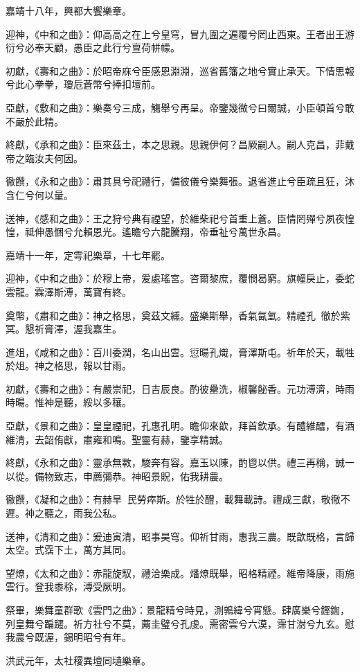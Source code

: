 嘉靖十八年，興都大饗樂章。

迎神，《中和之曲》：仰高高之在上兮皇穹，冒九圍之遍覆兮罔止西東。王者出王游衍兮必奉天顧，愚臣之此行兮亶荷帡幪。

初獻，《壽和之曲》：於昭帝庥兮臣感恩淵淵，巡省舊籓之地兮實止承天。下情思報兮此心拳拳，瓊卮蒼幣兮捧扣壇前。

亞獻，《敷和之曲》：樂奏兮三成，觴舉兮再呈。帝鑒幾微兮曰爾誠，小臣頓首兮敢不嚴於此精。

終獻，《承和之曲》：臣來茲土，本之思親。思親伊何？昌厥嗣人。嗣人克昌，菲戴帝之臨汝夫何因。

徹饌，《永和之曲》：肅其具兮祀禮行，備彼儀兮樂舞張。退省進止兮臣疏且狂，沐含仁兮何以量。

送神，《感和之曲》：王之狩兮典有禋望，於維柴祀兮首重上蒼。臣情罔殫兮夙夜惶惶，祗伸愚悃兮允賴恩光。遙瞻兮六龍騰翔，帝垂祉兮萬世永昌。

嘉靖十一年，定雩祀樂章，十七年罷。

迎神，《中和之曲》：於穆上帝，爰處瑤宮。咨爾黎庶，覆憫曷窮。旗幢戾止，委蛇雲龍。霖澤斯溥，萬寶有終。

奠幣，《肅和之曲》：神之格思，奠茲文纁。盛樂斯舉，香氣氤氳。精禋孔，徹於紫冥。懇祈膏澤，渥我嘉生。

進俎，《咸和之曲》：百川委潤，名山出雲。愆暘孔熾，膏澤斯屯。祈年於天，載牲於俎。神之格思，報以甘雨。

初獻，《壽和之曲》：有嚴崇祀，日吉辰良。酌彼罍洗，椒馨飶香。元功溥濟，時雨時暘。惟神是聽，綏以多穰。

亞獻，《景和之曲》：皇皇禋祀，孔惠孔明。瞻仰來歆，拜首欽承。有醴維醽，有酒維清，去韶侑獻，肅雍和鳴。聖靈有赫，鑒享精誠。

終獻，《永和之曲》：靈承無斁，駿奔有容。嘉玉以陳，酌鬯以供。禮三再稱，誠一以從。備物致志，申薦彌恭。神昭景貺，佑我耕農。

徹饌，《凝和之曲》：有赫旱，民勞瘁斯。於牲於醴，載舞載詩。禮成三獻，敬徹不遲。神之聽之，雨我公私。

送神，《清和之曲》：爰迪寅清，昭事昊穹。仰祈甘雨，惠我三農。既歆既格，言歸太空。式霑下土，萬方其同。

望燎，《太和之曲》：赤龍旋馭，禮洽樂成。燔燎既舉，昭格精禋。維帝降康，雨施雲行。登我黍稌，溥受厥明。

祭畢，樂舞童群歌《雲門之曲》：景龍精兮時見，測鶉緯兮宵懸。肆廣樂兮鏗鍧，列皇舞兮蹁躚。祈方社兮不莫，薦圭璧兮孔虔。需密雲兮六漠，霈甘澍兮九玄。慰我農兮既渥，錫明昭兮有年。

洪武元年，太社稷異壇同壝樂章。

